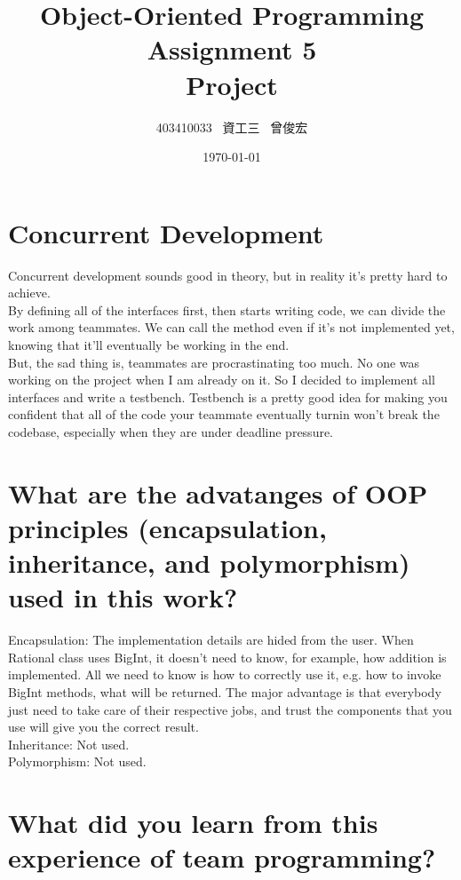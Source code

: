 \documentclass[12pt, A4]{article}
\title{Object-Oriented Programming\\ Assignment 5\\ Project}
\author{403410033 \ 資工三 \ 曾俊宏}
\date{\today}
\begin{document}
	
	\maketitle
	\newpage

    \section{Concurrent Development}
    
    Concurrent development sounds good in theory, but in reality it's pretty hard to achieve.\\
    
    By defining all of the interfaces first, then starts writing code, we can divide the work among teammates. We can call the method even if it's not implemented yet, knowing that it'll eventually be working in the end.\\
    
    But, the sad thing is, teammates are procrastinating too much. No one was working on the project when I am already on it. So I decided to implement all interfaces and write a testbench. Testbench is a pretty good idea for making you confident that all of the code your teammate eventually turnin won't break the codebase, especially when they are under deadline pressure.
    
    \section{What are the advatanges of OOP principles (encapsulation, inheritance, and polymorphism) used in this work?}
    
    Encapsulation: The implementation details are hided from the user. When Rational class uses BigInt, it doesn't need to know, for example, how addition is implemented. All we need to know is how to correctly use it, e.g. how to invoke BigInt methods, what will be returned. The major advantage is that everybody just need to take care of their respective jobs, and trust the components that you use will give you the correct result.\\
    
    Inheritance: Not used.\\
    
    Polymorphism: Not used.
    
    \newpage
    
    \section{What did you learn from this experience of team programming?}
    
\end{document}
